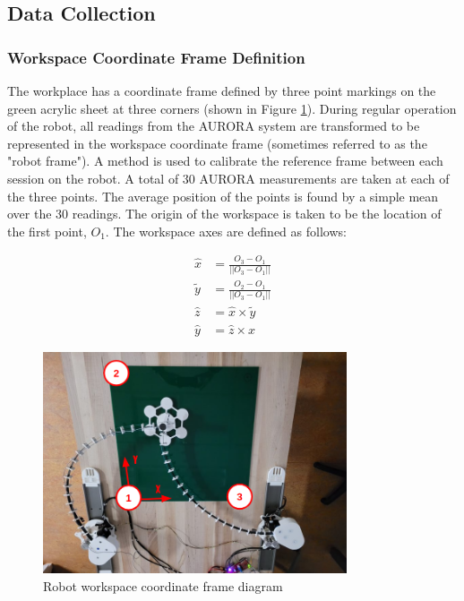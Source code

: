 \subsection{Data Collection}
\label{sec:data_methods}

\subsubsection{Workspace Coordinate Frame Definition}
The workplace has a coordinate frame defined by three point markings on the green acrylic sheet at three corners (shown in Figure \ref{fig:workspace}). During regular operation of the robot, all readings from the AURORA system are transformed to be represented in the workspace coordinate frame (sometimes referred to as the "robot frame"). A method is used to calibrate the reference frame between each session on the robot. A total of 30 AURORA measurements are taken at each of the three points. The average position of the points is found by a simple mean over the 30 readings. The origin of the workspace is taken to be the location of the first point, $O_1$. The workspace axes are defined as follows: 

\begin{align*}
    \hat{x} &= \frac{O_3 - O_1}{||O_3 - O_1||} \\
    \tilde{y} &= \frac{O_2 - O_1}{||O_3 - O_1||} \\
    \hat{z} &= \hat{x}\times\tilde{y} \\
    \hat{y} &= \hat{z}\times\hat{x}
\end{align*}

\begin{figure}[h]
    \centering
    \includegraphics[width=0.8\textwidth]{images/workspace.png}
    \caption{Robot workspace coordinate frame diagram}
    \label{fig:workspace}
\end{figure}


